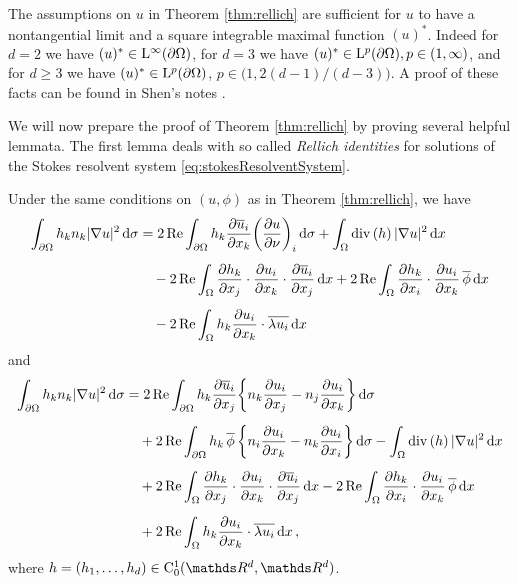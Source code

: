 \begin{rem}
  \label{rem:shenNontangential}
  The assumptions on $u$ in Theorem \ref{thm:rellich} are sufficient for $u$ to have a nontangential limit and a square integrable maximal function $(u)^*$. 
  Indeed for $d = 2$ we have $(u)^* \in \mathrm{L}^\infty(\partial\Omega)$, for $d = 3$ we have $(u)^* \in \mathrm{L}^p(\partial\Omega), p \in (1,\infty)$, and for $d \geq 3$ we have $(u)^* \in \mathrm{L}^p(\partial\Omega)$, $p \in \big(1, 2 (d - 1) / (d - 3) \big)$.
  A proof of these facts can be found in Shen's notes \cite[Prop. 7.1.3]{Shen2017}.
\end{rem}

We will now prepare the proof of Theorem \ref{thm:rellich} by proving several helpful lemmata.
The first lemma deals with so called \emph{Rellich identities} for solutions of the Stokes resolvent system \eqref{eq:stokesResolventSystem}.

\begin{lem}
  \label{lem:rellichIdentity}
  Under the same conditions on $(u,\phi)$ as in Theorem \ref{thm:rellich}, we have
  \begin{align}
    \int_{\partial\Omega} h_k n_k |\nabla u|^2 \, {\operatorname{d}\!{\sigma}} 
    &= 2 \operatorname{Re} \int_{\partial\Omega} h_k \frac{\partial \overline u_i}{\partial x_k} \bigg( \frac{\partial u}{\partial \nu} \bigg)_i \, {\operatorname{d}\!{\sigma}} + \int_\Omega \mathrm{div\,} (h)\, |\nabla u|^2 \, {\operatorname{d}\!{x}} \nonumber\\[0.5em]
    &\quad - 2 \operatorname{Re} \int_\Omega \frac{\partial h_k}{\partial x_j} \cdot \frac{\partial u_i}{\partial x_k} \cdot \frac{\partial \overline u_i}{\partial x_j} \, {\operatorname{d}\!{x}} + 2 \operatorname{Re} \int_\Omega \frac{\partial h_k}{\partial x_i} \cdot \frac{\partial u_i}{\partial x_k} \, \overline \phi \, {\operatorname{d}\!{x}} \nonumber\\[0.5em]
    &\quad - 2 \operatorname{Re} \int_\Omega h_k \frac{\partial u_i}{\partial x_k} \cdot \overline {\lambda u_i} \, {\operatorname{d}\!{x}} \label{eq:rellichIdentity}
  \end{align}
  and
  \begin{align}
    \int_{\partial\Omega} h_k n_k |\nabla u|^2 \, {\operatorname{d}\!{\sigma}}
    &= 2\operatorname{Re} \int_{\partial\Omega} h_k \frac{\partial \overline u_i}{\partial x_j} \bigg\{ n_k \frac{\partial u_i}{\partial x_j} - n_j \frac{\partial u_i}{\partial x_k} \bigg\} \, {\operatorname{d}\!{\sigma}} \nonumber\\[0.5em]
    &\quad + 2 \operatorname{Re} \int_{\partial\Omega} h_k \, \overline \phi \, \bigg\{ n_i \frac{\partial u_i}{\partial x_k} - n_k \frac{\partial u_i}{\partial x_i} \bigg\} \, {\operatorname{d}\!{\sigma}} - \int_\Omega \mathrm{div\,} (h)\, |\nabla u|^2 \, {\operatorname{d}\!{x}} \nonumber\\[0.5em]
    &\quad + 2 \operatorname{Re} \int_\Omega \frac{\partial h_k}{\partial x_j} \cdot \frac{\partial u_i}{\partial x_k} \cdot \frac{\partial \overline u_i}{\partial x_j} \, {\operatorname{d}\!{x}} - 2 \operatorname{Re} \int_\Omega \frac{\partial h_k}{\partial x_i} \cdot \frac{\partial u_i}{\partial x_k} \, \overline \phi \, {\operatorname{d}\!{x}} \nonumber\\[0.5em]
    &\quad + 2 \operatorname{Re} \int_\Omega h_k \frac{\partial u_i}{\partial x_k} \cdot \overline{ \lambda u_i} \, {\operatorname{d}\!{x}}\,, \label{eq:rellichIdentity2}
  \end{align}
  where $h = (h_1, \dots,h_d) \in \CC_0^1(\R^d, \R^d)$.
\end{lem}

